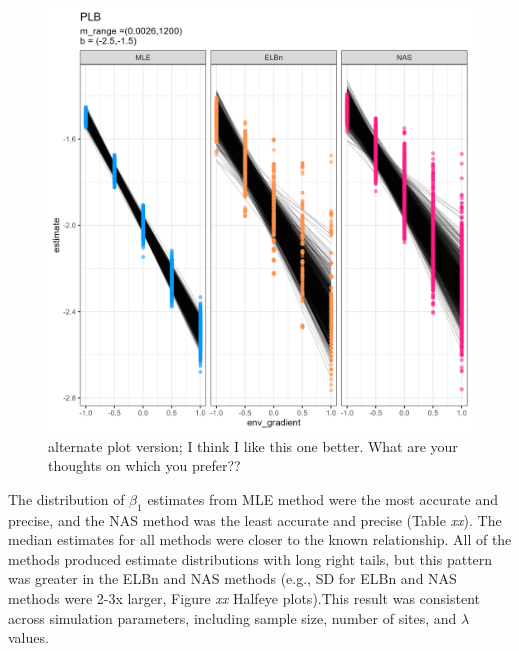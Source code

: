 \documentclass[
]{article}
\begin{document}
\begin{figure}
\centering
\includegraphics{figures/PLB_main_v2.png}
\caption{alternate plot version; I think I like this one better. What
are your thoughts on which you prefer??}
\end{figure}

The distribution of \(\beta_1\) estimates from MLE method were the most
accurate and precise, and the NAS method was the least accurate and
precise (Table \emph{xx}). The median estimates for all methods were
closer to the known relationship. All of the methods produced estimate
distributions with long right tails, but this pattern was greater in the
ELBn and NAS methods (e.g., SD for ELBn and NAS methods were 2-3x
larger, Figure \emph{xx} Halfeye plots).This result was consistent
across simulation parameters, including sample size, number of sites,
and \(\lambda\) values.

\newpage
\end{document}
